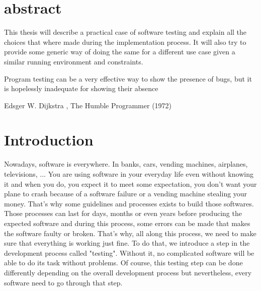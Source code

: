 \documentclass[12pt]{article}
\theoremstyle{definition}
\theoremstyle{definition}
\theoremstyle{remark}
\begin{document}



\section*{abstract}

This thesis will describe a practical case of software testing and explain all the choices that where made during the implementation process. It will also try to provide some generic way of doing the same for a different use case given a similar running environment and constraints.

\clearpage
\pagestyle{plain}
\pagebreak
\hspace{0pt}
\vfill
\epigraph{Program testing can be a very effective way to show the presence of bugs, but it is hopelessly inadequate for showing their absence}{Edsger W. Dijkstra , The Humble Programmer (1972)}
\vfill
\hspace{0pt}
\pagebreak

\clearpage

\tableofcontents

\clearpage

\section{Introduction}

Nowadays, software is everywhere. In banks, cars, vending machines, airplanes, televisions, ... You are using software in your everyday life even without knowing it and when you do, you expect it to meet some expectation, you don't want your plane to crash because of a software failure or a vending machine stealing your money. That's why some guidelines and processes exists to build those softwares. Those processes can last for days, months or even years before producing the expected software and during this process, some errors can be made that makes the software faulty or broken. That's why, all along this process, we need to make sure that everything is working just fine. To do that, we introduce a step in the development process called "testing". Without it, no complicated software will be able to do its task without problems. Of course, this testing step can be done differently depending on the overall development process but nevertheless, every software need to go through that step.\\
\end{document}
